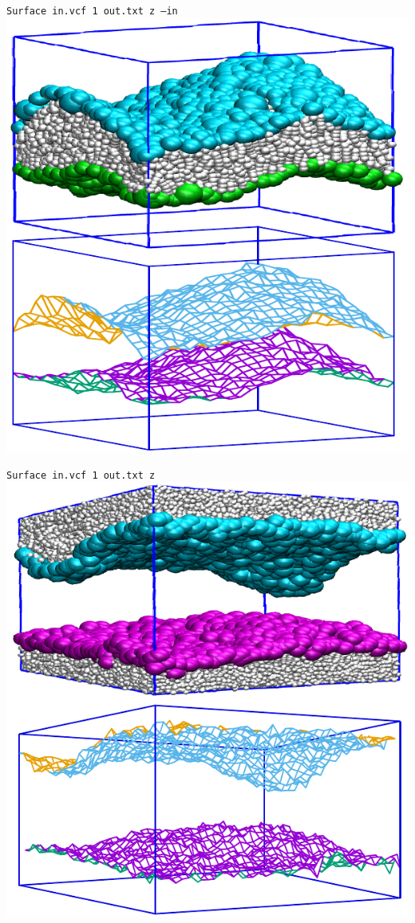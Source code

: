 \begin{minipage}{0.45\textwidth}
  \centering
  \tt{Surface in.vcf 1 out.txt z --in}
  \includegraphics[width=\textwidth]{Surface-bilayer.pdf}
\end{minipage}
\hfill
\begin{minipage}{0.45\textwidth}
  \tt{Surface in.vcf 1 out.txt z}
  \centering
  \includegraphics[width=\textwidth]{Surface-brush.pdf}
\end{minipage}

